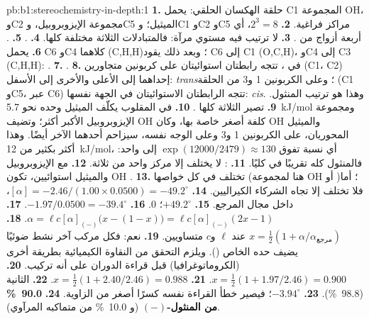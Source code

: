 \begin{solution}{pb:b1:stereochemistry-in-depth:1}
\textbf{1.} حلقة الهكسان الحلقي: يحمل C1 المجموعة OH، وC2 مجموعة الإيزوبروبيل، وC5
الميثيل؛ وC1 وC2 وC5 مراكز فراغية.
\textbf{2.} $2^3 = 8$، أي أربعة أزواج من .
\textbf{3.} لا ترتيب فيه مستوي مرآة: فالمتبادلات الثلاثة
مختلفة كلها.
\textbf{4.} .
\textbf{5.} .
\textbf{6.} يحمل C6 وC4 كلاهما (C,H,H)؛ وبعد ذلك يقود C6 إلى C1 (O,C,H)، وC4 إلى C3
(C,H,H): .
\textbf{7.} .
\textbf{8.} في ، تتجه رابطتان استوائيتان على كربونين متجاورين (C1، C2)
إحداهما إلى الأعلى والأخرى إلى الأسفل: \textit{trans}؛ وعلى الكربونين 1 و3 من الحلقة
(C1 وC5، عبر C6) تتجه الرابطتان الاستوائيتان في الجهة نفسها:
\textit{cis}. وهذا هو ترتيب المنثول.
\textbf{9.} تصير الثلاثة كلها .
\textbf{10.} في  المقلوب يكلّف الميثيل وحده نحو
\qty{5.7}{kJ/mol} ومجموعة الإيزوبروبيل الأكبر أكثر؛ وتضيف OH كلفة
أصغر خاصة بها، وكان OH والميثيل المحوريان، على الكربونين 1 و3 وعلى
الوجه نفسه، سيزاحم أحدهما الآخر أيضًا. وهذا أكثر بكثير من \qty{12}{kJ/mol}،
أي نسبة تفوق $\exp(12000/2479) \approx 130$ إلى واحد: فالمنثول كله تقريبًا
في   كليًا.
\textbf{11.} : لا يختلف إلا مركز واحد من ثلاثة.
\textbf{12.} مع الإيزوبروبيل والميثيل استوائيين، تكون OH .
\textbf{13.}  تختلف في كل خواصها (هنا
 لمجموعة OH  أو )؛ أما  فلا تختلف إلا
تجاه الشركاء الكيراليين.
\textbf{14.} $[\alpha] = -2.46/(1.00 \times 0.0500) = -49.2^\circ$، داخل
مجال المرجع.
\textbf{15.} $+49.2^\circ$؛ $0$.
\textbf{16.} $-1.97/0.0500 = -39.4^\circ$.
\textbf{17.} $\alpha = \ell c[\alpha]_{(-)}\bigl(x - (1 - x)\bigr) =
\ell c[\alpha]_{(-)}(2x - 1)$.
\textbf{18.} $x = \frac12(1 + \alpha/\alpha_{\text{مرجع}})$ عند $\ell$ و$c$ متساويين.
\textbf{19.} نعم: فكل مركب آخر نشط ضوئيًا يضيف حده الخاص
(). ويلزم التحقق من النقاوة الكيميائية بطريقة أخرى
(الكروماتوغرافيا) قبل قراءة الدوران على أنه تركيب.
\textbf{20.} $x = \frac12(1 + 1.97/2.46) = 0.900$.
\textbf{21.} $x = \frac12(1 + 2.40/2.46) = 0.988$.
\textbf{22.} الثانية (\qty{98.8}{\percent}).
\textbf{23.} $-3.94^\circ$؛ فيصير خطأ القراءة نفسه كسرًا أصغر
من الزاوية.
\textbf{24.} \textbf{\qty{90.0}{\percent} من المنثول-$(-)$} (و
\qty{10.0}{\percent} من متماكبه المرآوي).
\end{solution}
